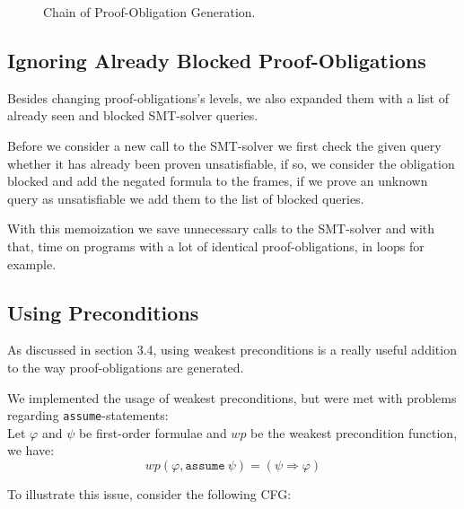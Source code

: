 \documentclass[11pt, a4paper, BCOR=10mm, ngerman]{scrbook}
\begin{document}
\begin{figure}[H]
\centering
\resizebox{\textwidth}{!}{}
\caption{Chain of Proof-Obligation Generation.}
\label{fig:the_nice_figure}
\end{figure}
 

\subsection{Ignoring Already Blocked Proof-Obligations}
Besides changing proof-obligations's levels, we also expanded them with a list of already seen and blocked SMT-solver queries. \par Before we consider a new call to the SMT-solver we first check the given query whether it has already been proven unsatisfiable, if so, we consider the obligation blocked and add the negated formula to the frames, if we prove an unknown query as unsatisfiable we add them to the list of blocked queries. \par
With this memoization we save unnecessary calls to the SMT-solver and with that, time on programs with a lot of identical proof-obligations, in loops for example.

\subsection{Using Preconditions}
As discussed in section 3.4, using weakest preconditions is a really useful addition to the way proof-obligations are generated. \par
We implemented the usage of weakest preconditions, but were met with problems regarding \texttt{assume}-statements: \\
Let $\varphi$ and $\psi$ be first-order formulae and $wp$ be the weakest precondition function, we have: 
\begin{equation}
	wp(\varphi, \texttt{assume}\ \psi) = (\psi \Rightarrow \varphi)
\end{equation}

To illustrate this issue, consider the following CFG: \\
\end{document}
